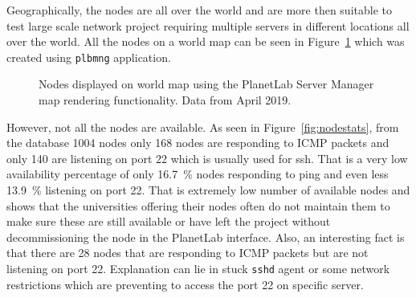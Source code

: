 {{{{{{{Geographically, the nodes are all over the world and are more then suitable to test large scale network project requiring multiple servers in different locations all over the world. All the nodes on a world map can be seen in Figure~\ref{fig:allnodes} which was created using \texttt{plbmng} application.

\begin{figure}[H]
	\centering
	\caption{Nodes displayed on world map using the PlanetLab Server Manager map rendering functionality. Data from April 2019.}
	\label{fig:allnodes}
\end{figure}

However, not all the nodes are available. As seen in Figure~\ref{fig:nodestats}, from the database 1004 nodes only 168 nodes are responding to ICMP packets and only 140 are listening on port 22 which is usually used for ssh. That is a very low availability percentage of only \SI{16.7}{\percent} nodes responding to ping and even less \SI{13.9}{\percent} listening on port 22. That is extremely low number of available nodes and shows that the universities offering their nodes often do not maintain them to make sure these are still available or have left the project without decommissioning the node in the PlanetLab interface. Also, an interesting fact is that there are 28 nodes that are responding to ICMP packets but are not listening on port 22. Explanation can lie in stuck \texttt{sshd} agent or some network restrictions which are preventing to access the port 22 on specific server.

}}}}}}}
